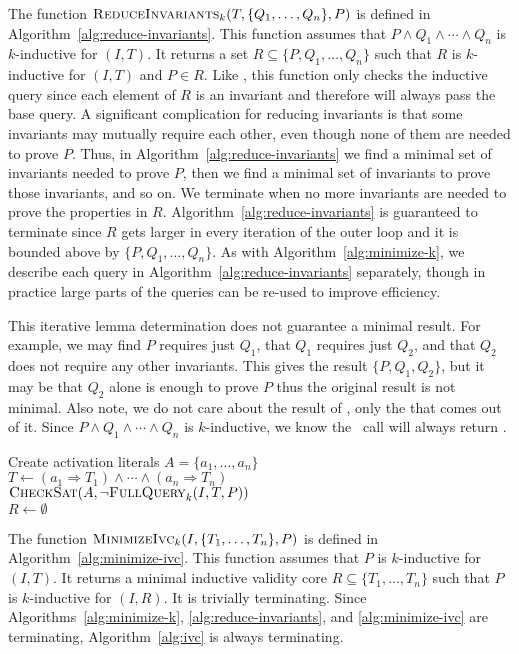 The function $\textsc{ReduceInvariants}_k(T, \{Q_1, \ldots, Q_n\}, P)$ is defined in
Algorithm~\ref{alg:reduce-invariants}. This function assumes that $P
\land Q_1 \land \cdots \land Q_n$ is $k$-inductive for $(I, T)$. It
returns a set $R \subseteq \{P, Q_1, \ldots, Q_n\}$ such that $R$ is
$k$-inductive for $(I, T)$ and $P \in R$. Like \mink, this function
only checks the inductive query since each element of $R$ is an
invariant and therefore will always pass the base query. A significant
complication for reducing invariants is that some invariants may
mutually require each other, even though none of them are needed to prove
$P$. Thus, in Algorithm~\ref{alg:reduce-invariants} we find a minimal
set of invariants needed to prove $P$, then we find a minimal set of
invariants to prove those invariants, and so on. We terminate when no
more invariants are needed to prove the properties in $R$.
Algorithm~\ref{alg:reduce-invariants} is guaranteed to terminate since
$R$ gets larger in every iteration of the outer loop and it is bounded
above by $\{P, Q_1, \ldots, Q_n\}$. As with
Algorithm~\ref{alg:minimize-k}, we describe each query in
Algorithm~\ref{alg:reduce-invariants} separately, though in practice
large parts of the queries can be re-used to improve efficiency.

This iterative lemma determination does not guarantee a minimal
result. For example, we may find $P$ requires just $Q_1$, that $Q_1$
requires just $Q_2$, and that $Q_2$ does not require any other
invariants. This gives the result $\{P, Q_1, Q_2\}$, but it may be
that $Q_2$ alone is enough to prove $P$ thus the original result is
not minimal. Also note, we do not care about the result of \checksat,
only the \unsatcore that comes out of it. Since $P \land Q_1 \land
\cdots \land Q_n$ is $k$-inductive, we know the \checksat\ call will
always return \unsat.

\begin{algorithm}[t]
  Create activation literals $A = \{a_1, \ldots, a_n\}$ \\
  $T \leftarrow (a_1 \Rightarrow T_1) \land \cdots \land (a_n \Rightarrow T_n)$ \\
  $\textsc{CheckSat}(A, \neg\textsc{FullQuery}_k(I, T, P))$ \\
  $R \leftarrow \emptyset$ \\
\caption{$\minivc_k(I, \{T_1, \ldots, T_n\}, P)$}
\label{alg:minimize-ivc}
\end{algorithm}

The function $\minivc_k(I, \{T_1, \ldots, T_n\}, P)$ is defined in
Algorithm~\ref{alg:minimize-ivc}. This function assumes that $P$ is
$k$-inductive for $(I, T)$. It returns a minimal inductive validity
core $R \subseteq \{T_1, \ldots, T_n\}$ such that $P$ is $k$-inductive
for $(I, R)$. It is trivially terminating. Since
Algorithms~\ref{alg:minimize-k}, \ref{alg:reduce-invariants}, and
\ref{alg:minimize-ivc} are terminating, Algorithm~\ref{alg:ivc} is
always terminating.

